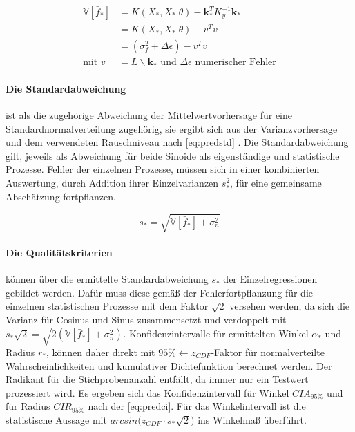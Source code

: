 \begin{align}\label{eq:predvar}
	\mathbb{V}\left[ \bar{f}_* \right] &= K(X_*, X_*|\theta) - \mathbf{k}_*^T K_y^{-1} \mathbf{k}_* \nonumber \\
									   &= K(X_*, X_*|\theta) - v^T v \\
									   &= (\sigma_f^2 + \Delta\epsilon) - v^T v \nonumber \\
						 \text{mit } v &= L \backslash \mathbf{k}_* \text{ und } \Delta\epsilon \text{ numerischer Fehler} \nonumber
\end{align}


\clearpage


\paragraph*{Die Standardabweichung} ist als die zugehörige Abweichung der Mittelwertvorhersage für eine Standardnormalverteilung zugehörig, sie ergibt sich aus der Varianzvorhersage und dem verwendeten Rauschniveau nach \autoref{eq:predstd} \cite{Rasmussen2006}. Die Standardabweichung gilt, jeweils als Abweichung für beide Sinoide als eigenständige und statistische Prozesse. Fehler der einzelnen Prozesse, müssen sich in einer kombinierten Auswertung, durch Addition ihrer Einzelvarianzen $s_*^2$, für eine gemeinsame Abschätzung fortpflanzen.


\begin{equation}\label{eq:predstd}
s_* = \sqrt{\mathbb{V}\left[ \bar{f}_* \right] + \sigma_n^2}
\end{equation}


\paragraph*{Die Qualitätskriterien} können über die ermittelte Standardabweichung $s_*$ der Einzelregressionen gebildet werden. Dafür muss diese gemäß der Fehlerfortpflanzung für die einzelnen statistischen Prozesse mit dem Faktor $\sqrt{2}$ versehen werden, da sich die Varianz für Cosinus und Sinus zusammensetzt und verdoppelt mit $s_* \sqrt{2} = \sqrt{2(\mathbb{V}\left[ \bar{f}_* \right] + \sigma_n^2)}$. Konfidenzintervalle für ermittelten Winkel $\bar{\alpha}_*$ und Radius $\bar{r}_*$, können daher direkt mit $95\% \leftarrow z_{CDF}$-Faktor für normalverteilte Wahrscheinlichkeiten und kumulativer Dichtefunktion berechnet werden. Der Radikant für die Stichprobenanzahl entfällt, da immer nur ein Testwert prozessiert wird. Es ergeben sich das Konfidenzintervall für Winkel $CIA_{95\%}$ und für Radius $CIR_{95\%}$ nach der \autoref{eq:predci}. Für das Winkelintervall ist die statistische Aussage mit $arcsin \big( z_{CDF} \cdot s_* \sqrt{2} \big)$ ins Winkelmaß überführt.


